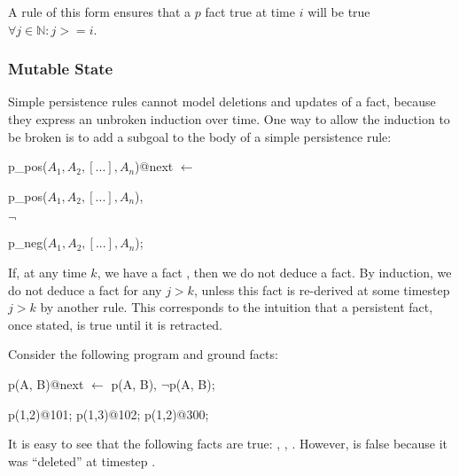 
\noindent
A rule of this form ensures that a $p$ fact true at time $i$ will be true $\forall j \in \mathbb{N} : j >= i$.


\subsubsection{Mutable State}
\label{sec:mutable}

Simple persistence rules cannot model deletions and updates of a fact, because
they express an unbroken induction over time.  One way to allow the induction to be
broken is to add a  subgoal to the body of a
simple persistence rule:

\begin{dedalus}
p\_pos($A_1,A_2,[...],A_n$)@next $\leftarrow$
\end{dedalus}

\hspace{5mm}
\begin{dedalus}
p\_pos($A_1,A_2,[...],A_n$),
\end{dedalus}

\hspace{5mm}
$\lnot$
\begin{dedalus}
p\_neg($A_1,A_2,[...],A_n$);
\end{dedalus}

\noindent
If, at any time $k$, we have a fact
, then we do not deduce a
 fact.  By induction, we do not
deduce a  fact for any $j > k$, unless
this  fact is re-derived at some timestep $j > k$ by another
rule.  This corresponds to the intuition that a persistent fact, once stated,
is true until it is retracted.

\begin{example}
Consider the following \lang program and ground facts:

\begin{Dedalus}
p\pos(A, B)@next \(\leftarrow\) p\pos(A, B), \(\lnot\)p\nega(A, B);

p(1,2)@101;
p(1,3)@102;
p\nega(1,2)@300;
\end{Dedalus}

It is easy to see that the following facts are true: ,
, .  However,  is
false because it was ``deleted'' at timestep .
\end{example}

